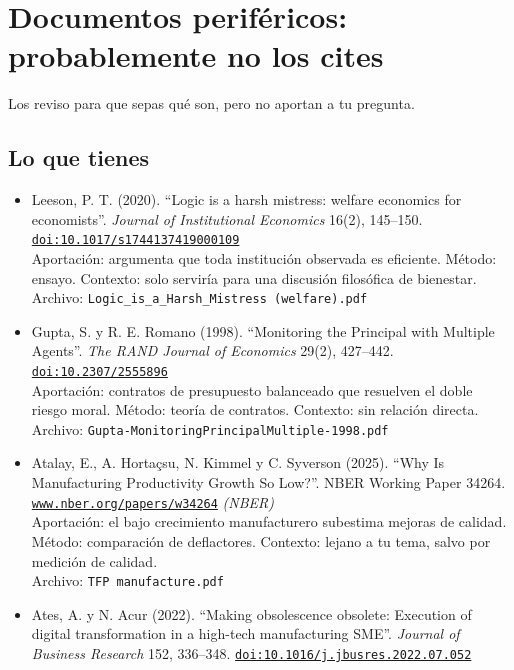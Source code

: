 \documentclass[11pt]{article}
\begin{document}
\section{Documentos periféricos: probablemente no los cites}
Los reviso para que sepas qué son, pero no aportan a tu pregunta.

\subsection*{Lo que tienes}
\begin{itemize}
\item Leeson, P. T. (2020). ``Logic is a harsh mistress: welfare economics for economists''. \textit{Journal of Institutional Economics} 16(2), 145--150. \href{https://doi.org/10.1017/s1744137419000109}{\texttt{doi:10.1017/s1744137419000109}}\\
Aportación: argumenta que toda institución observada es eficiente. Método: ensayo. Contexto: solo serviría para una discusión filosófica de bienestar.\\
{\footnotesize Archivo: \texttt{Logic\_is\_a\_Harsh\_Mistress (welfare).pdf}}
\item Gupta, S. y R. E. Romano (1998). ``Monitoring the Principal with Multiple Agents''. \textit{The RAND Journal of Economics} 29(2), 427--442. \href{https://doi.org/10.2307/2555896}{\texttt{doi:10.2307/2555896}}\\
Aportación: contratos de presupuesto balanceado que resuelven el doble riesgo moral. Método: teoría de contratos. Contexto: sin relación directa.\\
{\footnotesize Archivo: \texttt{Gupta-MonitoringPrincipalMultiple-1998.pdf}}
\item Atalay, E., A. Hortaçsu, N. Kimmel y C. Syverson (2025). ``Why Is Manufacturing Productivity Growth So Low?''. NBER Working Paper 34264. \href{https://www.nber.org/papers/w34264}{\texttt{www.nber.org/papers/w34264}} \textit{(NBER)}\\
Aportación: el bajo crecimiento manufacturero subestima mejoras de calidad. Método: comparación de deflactores. Contexto: lejano a tu tema, salvo por medición de calidad.\\
{\footnotesize Archivo: \texttt{TFP manufacture.pdf}}
\item Ates, A. y N. Acur (2022). ``Making obsolescence obsolete: Execution of digital transformation in a high-tech manufacturing SME''. \textit{Journal of Business Research} 152, 336--348. \href{https://doi.org/10.1016/j.jbusres.2022.07.052}{\texttt{doi:10.1016/j.jbusres.2022.07.052}}\\

\end{itemize}
\end{document}

